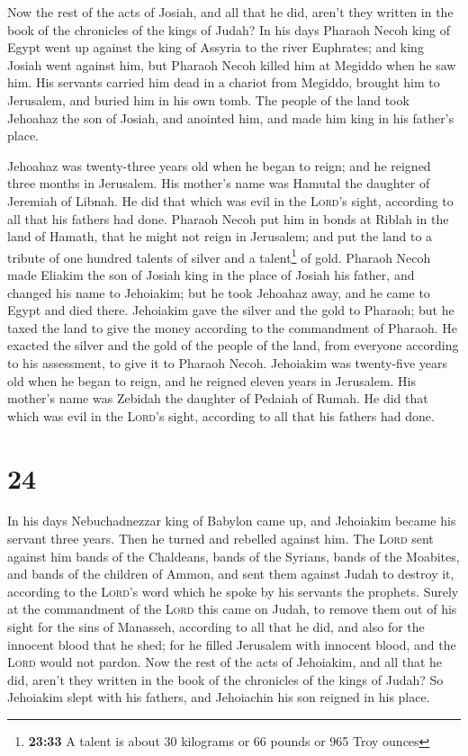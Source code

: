  Now the rest of the acts of Josiah, and all that he did,
aren't they written in the book of the chronicles of the kings of Judah?
 In his days Pharaoh Necoh king of Egypt went up against
the king of Assyria to the river Euphrates; and king Josiah went against
him, but Pharaoh Necoh killed him at Megiddo when he saw him.
 His servants carried him dead in a chariot from Megiddo,
brought him to Jerusalem, and buried him in his own tomb. The people of
the land took Jehoahaz the son of Josiah, and anointed him, and made him
king in his father's place.

 Jehoahaz was twenty-three years old when he began to
reign; and he reigned three months in Jerusalem. His mother's name was
Hamutal the daughter of Jeremiah of Libnah.  He did that
which was evil in the \textsc{Lord}'s sight, according to all that his
fathers had done.  Pharaoh Necoh put him in bonds at
Riblah in the land of Hamath, that he might not reign in Jerusalem; and
put the land to a tribute of one hundred talents of silver and a
talent\footnote{\textbf{23:33} A talent is about 30 kilograms or 66
  pounds or 965 Troy ounces} of gold.  Pharaoh Necoh made
Eliakim the son of Josiah king in the place of Josiah his father, and
changed his name to Jehoiakim; but he took Jehoahaz away, and he came to
Egypt and died there.  Jehoiakim gave the silver and the
gold to Pharaoh; but he taxed the land to give the money according to
the commandment of Pharaoh. He exacted the silver and the gold of the
people of the land, from everyone according to his assessment, to give
it to Pharaoh Necoh.  Jehoiakim was twenty-five years old
when he began to reign, and he reigned eleven years in Jerusalem. His
mother's name was Zebidah the daughter of Pedaiah of Rumah.
 He did that which was evil in the \textsc{Lord}'s sight,
according to all that his fathers had done.

\hypertarget{section-23}{%
\section{24}\label{section-23}}

 In his days Nebuchadnezzar king of Babylon came up, and
Jehoiakim became his servant three years. Then he turned and rebelled
against him.  The \textsc{Lord} sent against him bands of
the Chaldeans, bands of the Syrians, bands of the Moabites, and bands of
the children of Ammon, and sent them against Judah to destroy it,
according to the \textsc{Lord}'s word which he spoke by his servants the
prophets.  Surely at the commandment of the \textsc{Lord}
this came on Judah, to remove them out of his sight for the sins of
Manasseh, according to all that he did,  and also for the
innocent blood that he shed; for he filled Jerusalem with innocent
blood, and the \textsc{Lord} would not pardon.  Now the
rest of the acts of Jehoiakim, and all that he did, aren't they written
in the book of the chronicles of the kings of Judah?  So
Jehoiakim slept with his fathers, and Jehoiachin his son reigned in his
place.

